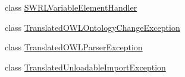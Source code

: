 \begin{DoxyCompactItemize}
\item 
class \hyperlink{classorg_1_1coode_1_1owlapi_1_1owlxmlparser_1_1_s_w_r_l_variable_element_handler}{S\-W\-R\-L\-Variable\-Element\-Handler}
\item 
class \hyperlink{classorg_1_1coode_1_1owlapi_1_1owlxmlparser_1_1_translated_o_w_l_ontology_change_exception}{Translated\-O\-W\-L\-Ontology\-Change\-Exception}
\item 
class \hyperlink{classorg_1_1coode_1_1owlapi_1_1owlxmlparser_1_1_translated_o_w_l_parser_exception}{Translated\-O\-W\-L\-Parser\-Exception}
\item 
class \hyperlink{classorg_1_1coode_1_1owlapi_1_1owlxmlparser_1_1_translated_unloadable_import_exception}{Translated\-Unloadable\-Import\-Exception}
\end{DoxyCompactItemize}
